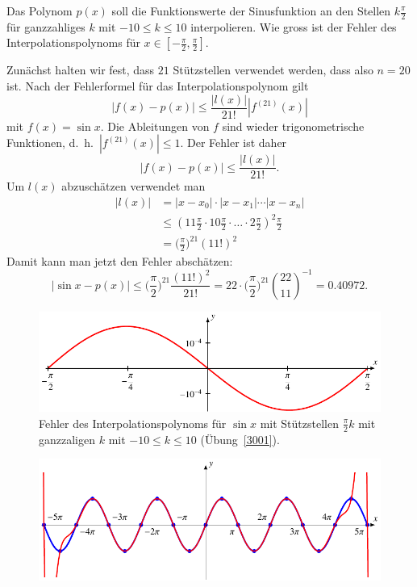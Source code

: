 Das Polynom $p(x)$ soll die Funktionswerte der Sinusfunktion an den
%
%
Stellen $k\frac{\pi}2$ für ganzzahliges $k$ mit $-10\le k\le 10$
interpolieren.
Wie gross ist der Fehler des Interpolationspolynoms für
$x\in [-\frac{\pi}2,\frac{\pi}2]$.
%
%

\begin{loesung}
Zunächst halten wir fest, dass $21$ Stützstellen verwendet werden, dass
also $n=20$ ist.
%
Nach der Fehlerformel für das Interpolationspolynom gilt
\[
|f(x)-p(x)| \le \frac{|l(x)|}{21!} |f^{(21)}(x)|
\]
mit $f(x)=\sin x$.
Die Ableitungen von $f$ sind wieder trigonometrische Funktionen,
d.~h.~$|f^{(21)}(x)|\le 1$.
%
%
Der Fehler ist daher
\[
|f(x)-p(x)| \le \frac{|l(x)|}{21!}.
\]
Um $l(x)$ abzuschätzen verwendet man
\begin{align*}
|l(x)|
&=
|x-x_0|\cdot|x-x_1|\cdots |x-x_n|
\\
&\le
(11\frac{\pi}2\cdot 10\frac{\pi}2\cdot\dots\cdot 2\frac{\pi}2)^2 \frac{\pi}2
\\
&=
\biggl(\frac{\pi}2\biggr)^{21}
(11!)^2
\end{align*}
Damit kann man jetzt den Fehler abschätzen:
\[
|\sin x-p(x)|
\le 
\biggl(\frac{\pi}2\biggr)^{21}
\frac{(11!)^2}{21!}
=
22\cdot 
\biggl(\frac{\pi}2\biggr)^{21}
\binom{22}{11}^{-1}
=
0.40972.
\]
\begin{figure}
\centering
\includegraphics{chapters/30-interpolation/uebungsaufgaben/3001fehler.pdf}
\caption{Fehler des Interpolationspolynoms für $\sin x$ mit Stützstellen
$\frac{\pi}2k$ mit ganzzaligen $k$ mit $-10\le k\le 10$
(Übung~\ref{3001}).
\label{buch:uebungsaufgaben:figure:3001}}
\end{figure}%
\begin{figure}
\centering
\includegraphics{chapters/30-interpolation/uebungsaufgaben/3001plot.pdf}

\end{figure}
\end{loesung}
